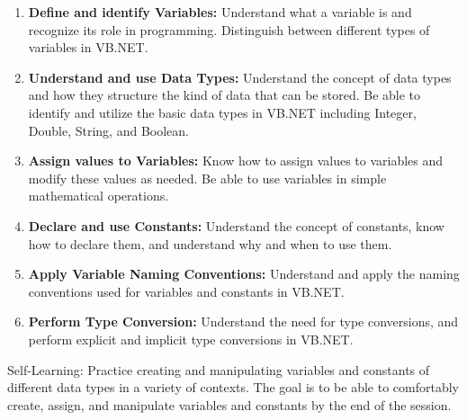 \documentclass[main.tex]{subfiles}
\begin{document}
\begin{enumerate}
  \item \textbf{Define and identify Variables:} Understand what a variable is and recognize its role in programming. Distinguish between different types of variables in VB.NET.

  \item \textbf{Understand and use Data Types:} Understand the concept of data types and how they structure the kind of data that can be stored. Be able to identify and utilize the basic data types in VB.NET including Integer, Double, String, and Boolean.

  \item \textbf{Assign values to Variables:} Know how to assign values to variables and modify these values as needed. Be able to use variables in simple mathematical operations.

  \item \textbf{Declare and use Constants:} Understand the concept of constants, know how to declare them, and understand why and when to use them.

  \item \textbf{Apply Variable Naming Conventions:} Understand and apply the naming conventions used for variables and constants in VB.NET.

  \item \textbf{Perform Type Conversion:} Understand the need for type conversions, and perform explicit and implicit type conversions in VB.NET.
\end{enumerate}

Self-Learning: Practice creating and manipulating variables and constants of different data types in a variety of contexts. The goal is to be able to comfortably create, assign, and manipulate variables and constants by the end of the session.
\end{document}
